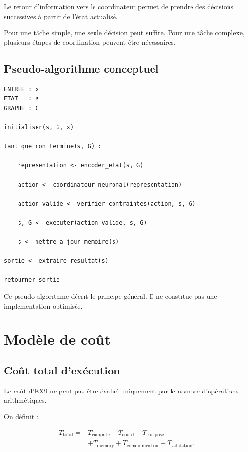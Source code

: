 \documentclass[11pt,a4paper]{article}
\begin{document}
Le retour d'information vers le coordinateur permet de prendre
des décisions successives à partir de l'état actualisé.

Pour une tâche simple, une seule décision peut suffire.
Pour une tâche complexe, plusieurs étapes de coordination peuvent
être nécessaires.

\subsection{Pseudo-algorithme conceptuel}

\begin{verbatim}
ENTREE : x
ETAT   : s
GRAPHE : G

initialiser(s, G, x)

tant que non termine(s, G) :

    representation <- encoder_etat(s, G)

    action <- coordinateur_neuronal(representation)

    action_valide <- verifier_contraintes(action, s, G)

    s, G <- executer(action_valide, s, G)

    s <- mettre_a_jour_memoire(s)

sortie <- extraire_resultat(s)

retourner sortie
\end{verbatim}

Ce pseudo-algorithme décrit le principe général.
Il ne constitue pas une implémentation optimisée.

\section{Modèle de coût}

\subsection{Coût total d'exécution}

Le coût d'EX9 ne peut pas être évalué uniquement par le nombre
d'opérations arithmétiques.

On définit :

\[
\begin{aligned}
T_{\mathrm{total}}
={}&T_{\mathrm{compute}}
+T_{\mathrm{coord}}
+T_{\mathrm{compose}}\\
&+T_{\mathrm{memory}}
+T_{\mathrm{communication}}
+T_{\mathrm{validation}}.
\end{aligned}
\]
\end{document}
